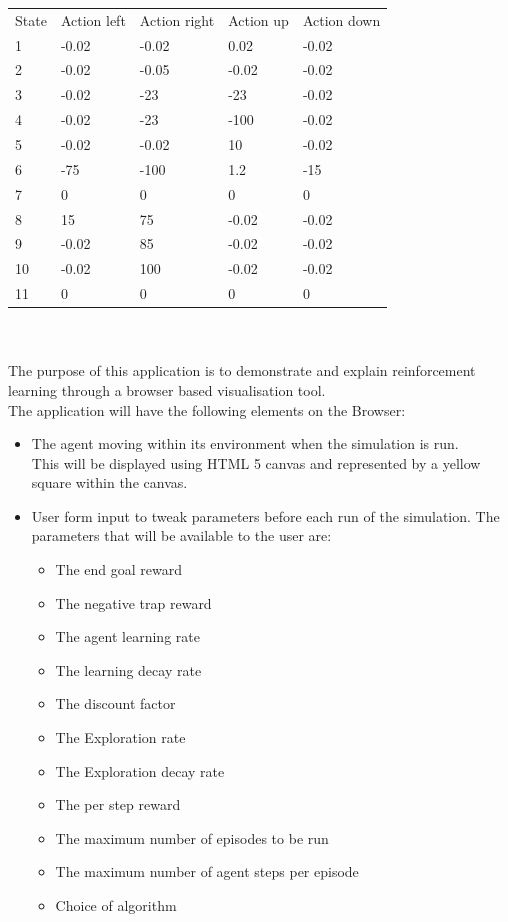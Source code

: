 \begin{tabular}{lllll}
	State & Action left & Action right & Action up & Action down \\
	1     & -0.02           & -0.02              & 0.02     & -0.02           \\
	2     & -0.02           & -0.05            & -0.02         & -0.02           \\
	3     & -0.02           & -23            & -23         & -0.02           \\
	4     & -0.02           & -23            & -100        & -0.02           \\
	5     &  -0.02        & -0.02           & 10       & -0.02       \\
	6     & -75           & -100            & 1.2         & -15           \\
	7     & 0           & 0            & 0         & 0          \\
	8     & 15           & 75            & -0.02         & -0.02           \\
	9     & -0.02          & 85           & -0.02        &-0.02         \\
	10    &  -0.02            & 100            &  -0.02          &  -0.02  \\ 
	11    & 0           & 0            & 0         & 0         
\end{tabular}
\\
\\
The purpose of this application is to demonstrate and explain reinforcement learning through a browser based visualisation tool.\\
The application will have the following elements on the Browser:
\begin{itemize}
\item The agent moving within its environment when the simulation is run.\\This will be displayed using HTML 5 canvas and represented by a yellow square within the canvas.

\item User form input to tweak parameters before each run of the simulation. The parameters that will be available to the user are:
	\begin{itemize}
		\item The end goal reward
		\item The negative trap reward
		\item The agent learning rate
		\item The learning decay rate
		\item The discount factor
		\item The Exploration rate
		\item The Exploration decay rate
		\item The per step reward
		\item The maximum number of episodes to be run
		\item The maximum number of agent steps per episode
		\item Choice of algorithm
	\end{itemize}
\end{itemize}


